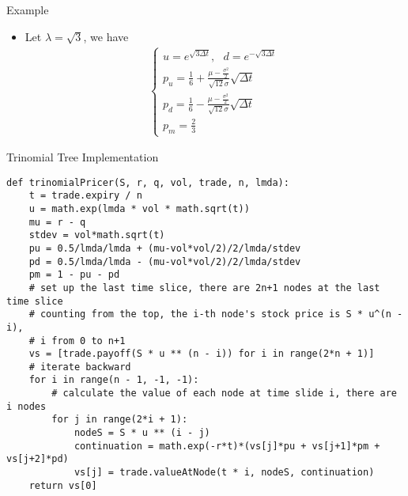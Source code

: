 \begin{frame}{Example}
\begin{itemize}
    \item Let $\lambda = \sqrt{3}$, we have
    \begin{align}
        \begin{cases}
u = e^{\sqrt{3 \Delta t}}, ~~~ d = e^{-\sqrt{3 \Delta t}} \\
p_u = \frac16 + \frac{\mu - \frac{\sigma^2}2}{\sqrt{12} \sigma} \sqrt{\Delta t} \\
p_d = \frac16 - \frac{\mu - \frac{\sigma^2}2}{\sqrt{12} \sigma} \sqrt{\Delta t} \\
p_m = \frac23
\end{cases}
\end{align}
\end{itemize}
\end{frame}

\begin{frame}[fragile]{Trinomial Tree Implementation}
\begin{lstlisting}
def trinomialPricer(S, r, q, vol, trade, n, lmda):
    t = trade.expiry / n
    u = math.exp(lmda * vol * math.sqrt(t))
    mu = r - q
    stdev = vol*math.sqrt(t)
    pu = 0.5/lmda/lmda + (mu-vol*vol/2)/2/lmda/stdev
    pd = 0.5/lmda/lmda - (mu-vol*vol/2)/2/lmda/stdev
    pm = 1 - pu - pd
    # set up the last time slice, there are 2n+1 nodes at the last time slice
    # counting from the top, the i-th node's stock price is S * u^(n - i),
    # i from 0 to n+1
    vs = [trade.payoff(S * u ** (n - i)) for i in range(2*n + 1)]
    # iterate backward
    for i in range(n - 1, -1, -1):
        # calculate the value of each node at time slide i, there are i nodes
        for j in range(2*i + 1):
            nodeS = S * u ** (i - j)
            continuation = math.exp(-r*t)*(vs[j]*pu + vs[j+1]*pm + vs[j+2]*pd)
            vs[j] = trade.valueAtNode(t * i, nodeS, continuation)
    return vs[0]
\end{lstlisting}
\end{frame}

